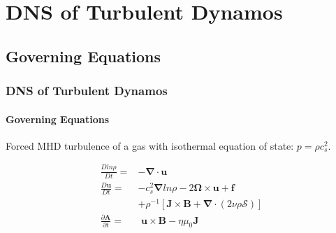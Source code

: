 \documentclass{beamer}
\begin{document}
 

 


\section{DNS of Turbulent Dynamos}

\subsection{Governing Equations}

\begin{frame}
 \frametitle{DNS of Turbulent Dynamos}
 \framesubtitle{Governing Equations}
 
 Forced MHD turbulence of a gas with isothermal equation of state: $p=\rho c_s^2$.
 
 \begin{align}
  \frac{D ln \rho}{Dt} =& - \bm{\nabla} \cdot \bm{u} \nonumber \\
  \frac{D \bm{u}}{Dt} =& -c_s^2 \bm{\nabla} ln \rho - 2 \bm{\Omega} \times \bm{u} + \bm{f} \nonumber \\
  & + \rho^{-1} [\bm{J} \times \bm{B} + \bm{\nabla} \cdot (2\nu \rho \bm{\mathcal{S}})] \nonumber \\
  \frac{\partial \bm{A}}{\partial t} =&\,\, \bm{u} \times \bm{B} - \eta \mu_0 \bm{J} \nonumber
 \end{align}

\end{frame}
\end{document}
